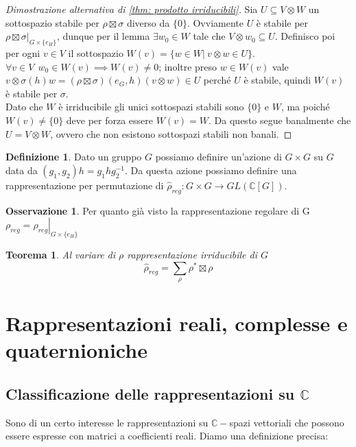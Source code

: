 \documentclass[11pt]{article}
\theoremstyle{plain}
\newtheorem{thm}{Teorema}[section]
\theoremstyle{definition}
\newtheorem{defn}{Definizione}[section]
\newtheorem*{rem}{Osservazione}
\theoremstyle{remark}
\newcommand{\C}{\mathbb{C}}
\begin{document}
\begin{proof}[Dimostrazione alternativa di \ref{thm: prodotto irriducibili}]
	Sia $U\subseteq V\otimes W$ un sottospazio stabile per $\rho\boxtimes\sigma$ diverso da $\lbrace0\rbrace$. Ovviamente $U$ è stabile per $\left.\rho\boxtimes\sigma\right|_{G\times\lbrace e_H\rbrace}$, dunque per il lemma $\exists w_0\in W$ tale che $V\otimes w_0 \subseteq U$. Definisco poi per ogni $v\in V$ il sottospazio $W(v)=\lbrace w\in W|\ v\otimes w\in U\rbrace$.\\
	$\forall v\in V\ \ w_0\in W(v) \implies W(v)\neq 0$; inoltre preso $w\in W(v)$ vale $v\otimes\sigma(h)w=(\rho\boxtimes\sigma)(e_G, h)(v\otimes w)\in U$ perché $U$ è stabile, quindi $W(v)$ è stabile per $\sigma$.\\
	Dato che $W$ è irriducibile gli unici sottospazi stabili sono $\lbrace0\rbrace$ e $W$, ma poiché $W(v)\neq\lbrace0\rbrace$ deve per forza essere $W(v)=W$. Da questo segue banalmente che $U=V\otimes W$, ovvero che non esistono sottospazi stabili non banali.
\end{proof}

\begin{defn}
	Dato un gruppo $G$ possiamo definire un'azione di $G\times G$ su $G$ data da $(g_1, g_2)h=g_1 h g_2^{-1}$. Da questa azione possiamo definire una rappresentazione per permutazione di $\hat{\rho}_{reg}:G\times G\to GL(\C[G])$.
\end{defn}
\begin{rem}
	Per quanto già visto la rappresentazione regolare di G $\rho_{reg} = \left.\hat{\rho}_{reg}\right|_{G\times\lbrace e_H\rbrace}$
\end{rem}
\begin{thm}
	Al variare di $\rho$ rappresentazione irriducibile di $G$
	\[
	\hat{\rho}_{reg} = \sum_{\rho}\rho^*\boxtimes\rho
	\]
\end{thm}







\newpage
\section{Rappresentazioni reali, complesse e quaternioniche}

\subsection{Classificazione delle rappresentazioni su $\C$}
Sono di un certo interesse le rappresentazioni su $\C-$spazi vettoriali che possono essere espresse con matrici a coefficienti reali. Diamo una definizione precisa:
\end{document}
